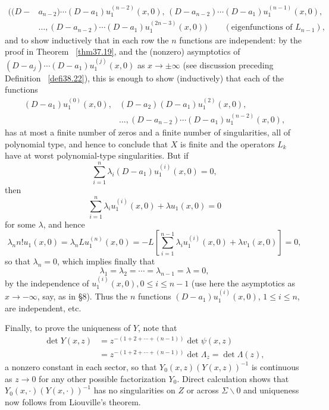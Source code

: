 \documentclass{surv-l}
\theoremstyle{plain}
\theoremstyle{definition}
\numberwithin{equation}{chapter}
\begin{document}
\begin{align*}
((D-&a_{n-2})\cdots(D-a_{1})u_{1}^{(n-2)}(x, 0),\, (D-a_{n-2})\cdots (D-a_{1})u_{1}^{(n-1)}(x, 0),\\
&\ldots,(D-a_{n-2})\cdots(D-a_{1})u_{1}^{(2n-3)}(x, 0))\qquad (\text{eigenfunctions of }L_{n-1}),
\end{align*}
and to show inductively that in each row the $n$ functions are independent: by the proof in Theorem ~\ref{thm37.19}, and the (nonzero) asymptotics of $(D-a_{j})\cdots(D-a_{1})u_{1}^{(j)}(x, 0)$ as $ x\rightarrow\pm\infty$ (see discussion preceding Definition ~\ref{defi38.22}), this is enough to show (inductively) that each of the functions
\begin{align*}
(D-a_{1})u_{1}^{(0)}(x, 0),&(D-a_{2})(D-a_{1})u_{1}^{(2)}(x, 0),\\
&\ldots,(D-a_{n-2})\cdots(D-a_{1})u_{1}^{(n-2)}(x, 0),
\end{align*}
has at most a finite number of zeros and a finite number of singularities, all of polynomial type, and hence to conclude that $X$ is finite and the operators $L_{k}$ have at worst polynomial-type singularities. But if
\begin{equation*}
\sum_{i=1}^{n}\lambda_{i}(D-a_{1})u_{1}^{(i)}(x, 0)=0,
\end{equation*}
then
\begin{equation*}
\sum_{i=1}^{n}\lambda_{i}u_{1}^{(i)}(x, 0)+\lambda u_{1}(x, 0)=0
\end{equation*}
for some $\lambda$, and hence
\begin{equation*}
\lambda_{n}n!u_{1}(x,0)=\lambda_{n}Lu_{1}^{(n)}(x,0)=-L\left[\sum_{i=1}^{n-1}\lambda_{i}u_{1}^{(i)}(x,0)+\lambda v_{1}(x, 0)\right]=0,
\end{equation*}
so that $\lambda_{n}=0$, which implies finally that
\begin{equation*}
\lambda_{1}=\lambda_{2}=\cdots=\lambda_{n-1}=\lambda=0,
\end{equation*}
by the independence of $u_{1}^{(i)}(x,0),0\leq i\leq n-1$ (use here the asymptotics as $ x\rightarrow-\infty$, say, as in \S8). Thus the $n$ functions $(D-a_{1})u_{1}^{(i)}(x, 0)$, $1\leq i\leq n$, are independent, etc.

Finally, to prove the uniqueness of $Y$, note that
\begin{align*}
\det Y(x, z)&=z^{-(1+2+\cdots+(n-1))}\det\psi(x, z)\\
&=z^{-(1+2+\cdots+(n-1))}\det\Lambda_{z}=\det\Lambda(z),
\end{align*}
a nonzero constant in each sector, so that $Y_{0}(x,z)(Y(x, z))^{-1}$ is continuous as $z\rightarrow 0$ for any other possible factorization $Y_{0}$. Direct calculation shows that $Y_{0}(x, \cdot)(Y(x, \cdot))^{-1}$ has no singularities on $Z$ or across $\Sigma\backslash 0$ and uniqueness now follows from Liouville's theorem.
\end{document}
